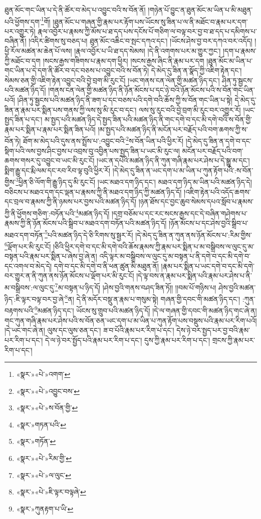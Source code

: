 ཐུན་མོང་གང་ཡིན་པ་དེ་ནི་ཚོར་བ་མེད་པ་འབྱུང་བའི་ས་བོན་ནོ། །གཉེན་པོ་བྱུང་ན་ཐུན་མོང་མ་ཡིན་པ་མི་མཐུན་པའི་ཕྱོགས་དག་\footnote{«སྣར་»«པེ་»འགག་}གོ། །ཐུན་མོང་པ་གཞན་གྱི་རྣམ་པར་རྟོག་པས་ཡོངས་སུ་ཟིན་པ་ལ་ནི་མཐོང་བ་རྣམ་པར་དག་པར་འགྱུར་ཏེ། རྣལ་འབྱོར་པ་རྣམས་ཀྱི་མོས་པ་ཐ་དད་པས་དངོས་པོ་གཅིག་ལ་བལྟ་བར་བྱ་བ་ཐ་དད་པ་དམིགས་པ་བཞིན་ནོ། །འདིར་ཚིགས་སུ་བཅད་པ། ཐུན་མོང་འཆིང་བ་སྤང་དཀའ་དང་། །ཡོངས་ཤེས་བྱ་བར་དཀའ་བར་འདོད། །ཕྱི་རོལ་མཚན་མ་ཆེན་པོ་ལས། །རྣལ་འབྱོར་པ་ཡི་ཐ་དད་སེམས། །དེ་ནི་འགགས་པར་མ་གྱུར་ཀྱང་། །དག་པ་རྣམས་ཀྱི་མཐོང་བ་དག །སངས་རྒྱས་གཟིགས་པ་རྣམ་དག་ཕྱིར། །སངས་རྒྱས་ཞིང་ནི་རྣམ་པར་དག །ཐུན་མོང་མ་ཡིན་པ་གང་ཡིན་པ་དེ་དག་ནི་ཚོར་བ་དང་བཅས་པ་འབྱུང་བའི་ས་བོན་ཏེ། དེ་མེད་དུ་ཟིན་ན་སྣོད་ཀྱི་འཇིག་རྟེན་དང་། སེམས་ཅན་གྱི་འཇིག་རྟེན་འབྱུང་བའི་བྱེ་བྲག་མི་རུང་ངོ། །ཡང་གནས་ངན་ལེན་གྱི་མཚན་ཉིད་དང་། ཤིན་ཏུ་སྦྱངས་པའི་མཚན་ཉིད་དོ། །གནས་ངན་ལེན་གྱི་མཚན་ཉིད་ནི་ཉོན་མོངས་པ་དང་ཉེ་བའི་ཉོན་མོངས་པའི་ས་བོན་གང་ཡིན་པའོ། །ཤིན་ཏུ་སྦྱངས་པའི་མཚན་ཉིད་ནི་ཟག་པ་དང་བཅས་པའི་དགེ་བའི་ཆོས་ཀྱི་ས་བོན་གང་ཡིན་པ་སྟེ། དེ་མེད་དུ་ཟིན་ན་རྣམ་པར་སྨིན་པས་གནས་ཀྱི་ལས་སུ་མི་རུང་བ་དང་། ལས་སུ་རུང་བའི་བྱེ་བྲག་མི་རུང་བར་འགྱུར་རོ། །ཡང་སྤྱད་ཟིན་པ་དང་། མ་སྤྱད་པའི་མཚན་ཉིད་དེ་སྤྱད་ཟིན་པའི་མཚན་ཉིད་ནི་གང་དགེ་བ་དང་མི་དགེ་བའི་ས་བོན་གྱི་རྣམ་པར་སྨིན་པ་རྣམ་པར་སྨིན་ཟིན་པའོ། །མ་སྤྱད་པའི་མཚན་ཉིད་ནི་མངོན་པར་བརྗོད་པའི་བག་ཆགས་ཀྱི་ས་བོན་ཏེ། ཐོག་མ་མེད་པའི་དུས་ནས་སྤྲོས་པ་:འབྱུང་བའི་\footnote{«སྣར་»«པེ་»འབྱུང་བས་}ས་བོན་ཡིན་པའི་ཕྱིར་རོ། །དེ་མེད་དུ་ཟིན་ན་དགེ་བ་དང་སྡིག་པའི་ལས་བྱས་ཤིང་བྱས་པ་འབྲས་བུ་འབྱིན་པས་སྤྱད་ཟིན་པ་ཡང་མི་རུང་ལ། མངོན་པར་བརྗོད་པའི་བག་ཆགས་གསར་དུ་འབྱུང་བ་ཡང་མི་རུང་ངོ། །ཡང་ན་དཔེའི་མཚན་ཉིད་ནི་ཀུན་གཞི་རྣམ་པར་ཤེས་པ་དེ་སྒྱུ་མ་དང་། སྨིག་རྒྱུ་དང་རྨི་ལམ་དང་རབ་རིབ་ལྟ་བུའི་ཕྱིར་རོ། །དེ་མེད་དུ་ཟིན་ན་ཡང་དག་པ་མ་ཡིན་པ་ཀུན་རྟོག་པའི་:ས་བོན་གྱིས་\footnote{«སྣར་»«པེ་»ས་བོན་གྱི་}ཕྱིན་ཅི་ལོག་གི་རྒྱུ་ཉིད་དུ་མི་རུང་ངོ། །ཡང་མཐའ་དག་ཉིད་དང་། མཐའ་དག་ཉིད་མ་ཡིན་པའི་མཚན་ཉིད་དེ། བཅིངས་པ་མཐའ་དག་དང་ལྡན་པ་རྣམས་ཀྱི་ནི་མཐའ་དག་ཉིད་ཀྱི་མཚན་ཉིད་དོ། །འཇིག་རྟེན་པའི་འདོད་ཆགས་དང་བྲལ་བ་རྣམས་ཀྱི་ནི་ཉམས་པར་བྱས་པའི་མཚན་ཉིད་དོ། །ཉན་ཐོས་དང་བྱང་ཆུབ་སེམས་དཔའ་སློབ་པ་རྣམས་ཀྱི་ནི་ཕྱོགས་གཅིག་:བཏོན་པའི་\footnote{«སྣར་»གཏན་པའི་}མཚན་ཉིད་དོ། །དགྲ་བཅོམ་པ་དང་རང་སངས་རྒྱས་དང་དེ་བཞིན་གཤེགས་པ་རྣམས་ཀྱི་ནི་ཉོན་མོངས་པའི་སྒྲིབ་པ་མཐའ་དག་བཏོན་པའི་མཚན་ཉིད་དོ། །ཉོན་མོངས་པ་དང་ཤེས་བྱའི་སྒྲིབ་པ་མཐའ་དག་བཏོན་\footnote{«སྣར་»གཏོན་}པའི་མཚན་ཉིད་དེ་ཅི་རིགས་སུ་སྦྱར་རོ། །དེ་མེད་དུ་ཟིན་ན་ཀུན་ནས་ཉོན་མོངས་པ་:རིམ་གྱིས་\footnote{«སྣར་»«པེ་»རིམ་གྱི་}ལྡོག་པར་མི་རུང་ངོ། །ཅིའི་ཕྱིར་དགེ་བ་དང་མི་དགེ་བའི་ཆོས་རྣམས་ཀྱི་རྣམ་པར་སྨིན་པ་མ་བསྒྲིབས་ལ་ལུང་དུ་མ་བསྟན་པའི་རྣམ་པར་སྨིན་པ་ཞེས་བྱ་ཞེ་ན། འདི་ལྟར་མ་བསྒྲིབས་ལ་ལུང་དུ་མ་བསྟན་པ་ནི་དགེ་བ་དང་མི་དགེ་བ་དང་འགལ་བ་མེད་དེ། དགེ་བ་དང་མི་དགེ་བ་ནི་ཕན་ཚུན་མི་མཐུན་ནོ། །རྣམ་པར་སྨིན་པ་ཡང་དགེ་བ་དང་མི་དགེ་བར་གྱུར་ན་ནི་ཀུན་ནས་ཉོན་མོངས་པ་ལྡོག་པར་མི་རུང་ངོ། །དེ་ལྟ་བས་ན་རྣམ་པར་སྨིན་པའི་རྣམ་པར་ཤེས་པ་ནི་མ་བསྒྲིབས་:ལ་ལུང་དུ་\footnote{«སྣར་»«པེ་»ལ་ལུང་}མ་བསྟན་པ་ཉིད་དོ། །ཤེས་བྱའི་གནས་བཤད་ཟིན་ཏོ།། །།བམ་པོ་གཉིས་པ། ཤེས་བྱའི་མཚན་ཉིད་:ཇི་ལྟར་བལྟ་བར་བྱ་ཞེ་\footnote{«སྣར་»«པེ་»ཇི་ལྟར་བལྟཞེ་}ན། དེ་ནི་མདོར་བསྡུ་ན་རྣམ་པ་གསུམ་སྟེ། གཞན་གྱི་དབང་གི་མཚན་ཉིད་དང་། :ཀུན་བརྟགས་པའི་\footnote{«སྣར་»ཀུནརྟག་པ་ཡི་}མཚན་ཉིད་དང་། ཡོངས་སུ་གྲུབ་པའི་མཚན་ཉིད་དོ། །དེ་ལ་གཞན་གྱི་དབང་གི་མཚན་ཉིད་གང་ཞེ་ན། གང་ཀུན་གཞི་རྣམ་པར་ཤེས་པའི་ས་བོན་ཅན་ཡང་དག་པ་མ་ཡིན་པ་ཀུན་རྟོག་པས་བསྡུས་པའི་རྣམ་པར་རིག་པའོ། །དེ་ཡང་གང་ཞེ་ན། ལུས་དང་ལུས་ཅན་དང་། ཟ་བ་པོའི་རྣམ་པར་རིག་པ་དང་། དེས་ཉེ་བར་སྤྱད་པར་བྱ་བའི་རྣམ་པར་རིག་པ་དང་། དེ་ལ་ཉེ་བར་སྤྱོད་པའི་རྣམ་པར་རིག་པ་དང་། དུས་ཀྱི་རྣམ་པར་རིག་པ་དང་། གྲངས་ཀྱི་རྣམ་པར་རིག་པ་དང་། 